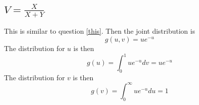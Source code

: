 \documentclass[answers]{exam}
\begin{document}
\begin{questions}
\begin{parts}
	\part{$V=\frac{X}{X+Y}$}
\end{parts}

\begin{solution}
	This is similar to question \ref{this}. Then the joint distribution is
	$$g(u,v) = ue^{-u}$$
	The distribution for $u$ is then
	$$g(u) = \int_0^1 ue^{-u}dv = ue^{-u}$$
	The distribution for $v$ is then
	$$g(v) = \int_0^\infty ue^{-u}du = 1$$
\end{solution}

\end{questions}
\end{document}
